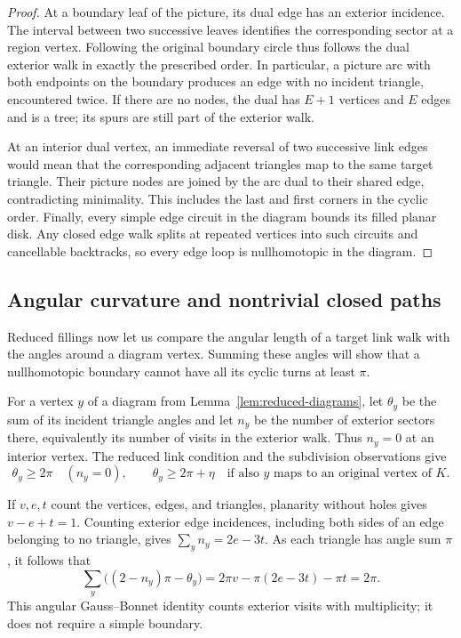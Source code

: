 \begin{proof}
At a boundary leaf of the picture, its dual edge has an exterior
incidence. The interval between two successive leaves identifies the
corresponding sector at a region vertex. Following the original boundary
circle thus follows the dual exterior walk in exactly the prescribed
order. In particular, a picture arc with both endpoints on the boundary
produces an edge with no incident triangle, encountered twice. If there
are no nodes, the dual has $E+1$ vertices and $E$ edges and is a tree;
its spurs are still part of the exterior walk.

At an interior dual vertex, an immediate reversal of two successive
link edges would mean that the corresponding adjacent triangles map
to the same target triangle. Their picture nodes are joined by the
arc dual to their shared edge, contradicting minimality. This includes
the last and first corners in the cyclic order. Finally, every simple
edge circuit in the diagram bounds its filled planar disk. Any closed
edge walk splits at repeated vertices into such circuits and cancellable
backtracks, so every edge loop is nullhomotopic in the diagram.
\end{proof}

\subsection{Angular curvature and nontrivial closed paths}

Reduced fillings now let us compare the angular length of a target link
walk with the angles around a diagram vertex. Summing these angles will
show that a nullhomotopic boundary cannot have all its cyclic turns at
least $\pi$.

For a vertex $y$ of a diagram from Lemma~\ref{lem:reduced-diagrams}, let
$\theta_y$ be the sum of its incident triangle angles and let $n_y$ be
the number of exterior sectors there, equivalently its number of visits
in the exterior walk. Thus $n_y=0$ at an interior vertex. The reduced
link condition and the subdivision observations give
\[
 \theta_y\ge 2\pi \quad(n_y=0),\qquad
 \theta_y\ge 2\pi+\eta
 \quad\text{if also $y$ maps to an original vertex of $K$.}
\]

If $v,e,t$ count the vertices, edges, and triangles, planarity without
holes gives $v-e+t=1$. Counting exterior edge incidences, including both
sides of an edge belonging to no triangle, gives
$\sum_y n_y=2e-3t$. As each triangle has angle sum $\pi$, it follows that
\begin{equation}
 \sum_y\bigl((2-n_y)\pi-\theta_y\bigr)
 =2\pi v-\pi(2e-3t)-\pi t
 =2\pi.
 \label{eq:gauss-bonnet}
\end{equation}
This angular Gauss--Bonnet identity counts exterior visits with
multiplicity; it does not require a simple boundary.

